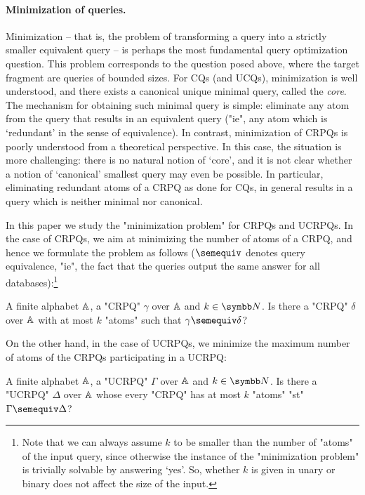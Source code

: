 \paragraph{Minimization of queries.}
Minimization -- that is, the problem of transforming a query into a strictly smaller equivalent 
query -- is perhaps the most fundamental query optimization question. This problem corresponds to the question posed above, where the target fragment are queries of bounded sizes. 
For CQs (and UCQs), minimization is well understood, and there exists a canonical unique minimal query, called the \emph{core}.
The mechanism for obtaining such minimal query is simple: eliminate any atom from the query that results in an equivalent query ("ie", any atom which is `redundant'  in the sense of equivalence).
In contrast, minimization of CRPQs is poorly understood from a theoretical perspective. In this case, the situation is more challenging: there is no natural notion of `core’, and it is not clear whether a notion of `canonical’ smallest query may even be possible. In particular, eliminating redundant atoms of a CRPQ as done for CQs, in general results in a query which is neither minimal nor canonical.

In this paper we study the "minimization problem" for CRPQs and UCRPQs. In the case of CRPQs, we aim at minimizing the number of atoms of a CRPQ, and hence we formulate the problem as follows ($\semequiv$ denotes query equivalence, "ie", the fact that the queries output the same answer for all databases):\footnote{Note that we can always assume $k$ to be smaller than the number of "atoms" of the input query, since otherwise the instance of the "minimization problem" is trivially solvable by answering `yes'. So, whether $k$ is given in unary or binary does not affect the size of the input.}
 
{A finite alphabet $\mathbb{A}$, a "CRPQ" $\gamma$ over $\mathbb{A}$ and $k \in \N$.}
{Is there a "CRPQ" $\delta$ over $\mathbb{A}$ with at most $k$ "atoms" 
such that $\gamma \semequiv \delta$?}
\medskip

On the other hand, in the case of UCRPQs, we minimize the maximum number of atoms of the CRPQs participating in a UCRPQ:
	
{A finite alphabet $\mathbb{A}$, a "UCRPQ" $\Gamma$ over $\mathbb{A}$ and $k \in \N$.}
{Is there a "UCRPQ" $\Delta$ over $\mathbb{A}$ whose every "CRPQ" has at most $k$ "atoms" 
"st" $\Gamma \semequiv \Delta$?}
\medskip

